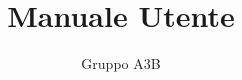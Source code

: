 \subject{Progetto Climate Monitoring}
\title{Manuale Utente}
\subtitle{}
\author{Gruppo A3B}
\date{\ISOToday ~ \thistime}
